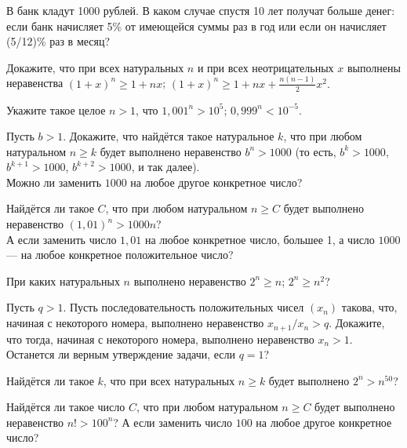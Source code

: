 \documentclass[a4paper,12pt]{article}
\begin{document}


В банк кладут 1000 рублей. В каком случае спустя 10 лет %
получат больше денег: если банк начисляет 5\% от имеющейся суммы раз
в год или если он начисляет (5/12)\% раз в месяц?


Докажите, что при всех натуральных $n$ и при всех неотрицательных $x$
выполнены неравенства
 $(1+x)^n\ge 1+nx$;
 $(1+x)^n\ge 1+nx+\frac{n(n-1)}{2}x^2.$

 Укажите такое целое $n>1$, что
 $1,001^n>10^5$;
 $0,999^n<10^{-5}$.



Пусть $b>1$.
Докажите, что найд\"ется такое натуральное $k$, что при любом
натуральном $n\geq k$ будет выполнено неравенство $b^n>1000$
(то есть, $b^k>1000,$ $b^{k+1}>1000$, $b^{k+2}>1000$,
и так далее).\\
Можно ли %
заменить %
$1000$ на любое другое
конкретное число?

Найд\"ется ли такое $C$,
что при любом натуральном $n\geq C$ будет выполнено неравенство
$(1,01)^n>1000n$?\\
А если заменить число $1,01$
на любое конкретное число, большее 1, а число $1000$ --- на любое
конкретное положительное число?

При каких натуральных $n$ выполнено неравенство
$2^n\geq n$;
$2^n\geq n^2$?

Пусть $q>1$. Пусть последовательность положительных чисел $(x_n)$ такова,
что, начиная с некоторого номера, выполнено неравенство
$x_{n+1}/x_n>q$. Докажите, что тогда,
начиная с некоторого номера, выполнено неравенство $x_n>1$.\\
Останется ли верным утверждение задачи, если $q=1$?



 Найд\"ется ли такое %
$k$, что при всех натуральных $n\geq k$
будет выполнено %
$2^n>n^{50}$?


Найд\"ется ли такое число $C$,
что при любом натуральном  $n\geq C$ будет выполнено неравенство
$n!>100^n$?
А если заменить число $100$ на любое другое конкретное число?
\end{document}
